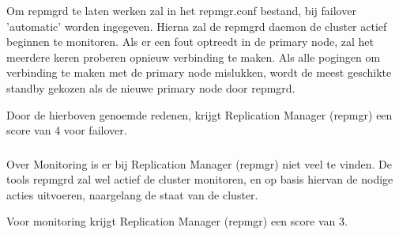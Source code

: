 Om repmgrd te laten werken zal in het repmgr.conf bestand, bij failover 'automatic' worden ingegeven. Hierna zal de repmgrd daemon de cluster actief beginnen te monitoren. Als er een fout optreedt in de primary node, zal het meerdere keren proberen opnieuw verbinding te maken. Als alle pogingen om verbinding te maken met de primary node mislukken, wordt de meest geschikte standby gekozen als de nieuwe primary node door repmgrd.

Door de hierboven genoemde redenen, krijgt Replication Manager (repmgr) een score van 4 voor failover.

\subsubsection{}
\label{subsubsec:Ondersteuning van monitoring}

Over Monitoring is er bij Replication Manager (repmgr) niet veel te vinden. De tools repmgrd zal wel actief de cluster monitoren, en op basis hiervan de nodige acties uitvoeren, naargelang de staat van de cluster.

Voor monitoring krijgt Replication Manager (repmgr) een score van 3.

\subsection{}
\label{subsec:Should have}



\subsubsection{}
\label{subsubsec:Actieve ondersteuning in 2020-2021}

\subsubsection{}
\label{subsubsec:Open source}

